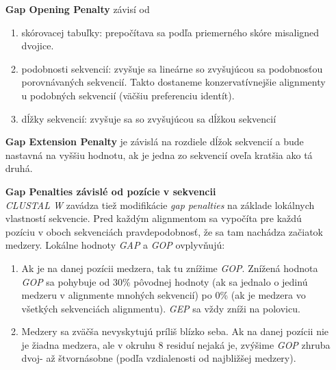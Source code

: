 \documentclass[nobib]{tufte-handout}
\begin{document}
 \begin{itemize}
 \item [\textbf{Gap Opening Penalty}] závisí od
	 \begin{enumerate}
	 \item skórovacej tabuľky: prepočítava sa podľa priemerného skóre misaligned dvojice.
	 \item podobnosti sekvencií: zvyšuje sa lineárne so zvyšujúcou sa podobnosťou porovnávaných sekvencií. Takto dostaneme konzervatívnejšie alignmenty u podobných sekvencií (väčšiu preferenciu identít).
	 \item dĺžky sekvencií: zvyšuje sa so zvyšujúcou sa dĺžkou sekvencií
	 \end{enumerate}

 \item[\textbf{Gap Extension Penalty}]
	 je závislá na rozdiele dĺžok sekvencií a bude nastavná na vyššiu hodnotu, ak je jedna zo sekvencií oveľa kratšia ako tá druhá.
	 
 \item[\textbf{Gap Penalties závislé od pozície v sekvencii}] $ $\\
 
\emph{CLUSTAL W} zavádza tiež modifikácie \emph{gap penalties} na základe lokálnych vlastností sekvencie. Pred každým alignmentom sa vypočíta pre každú pozíciu v oboch sekvenciách pravdepodobnosť, že sa tam nachádza začiatok medzery. Lokálne hodnoty \emph{GAP} a \emph{GOP} ovplyvňujú:

\begin{enumerate}
\item Ak je na danej pozícii medzera, tak tu znížime \emph{GOP}. Znížená hodnota \emph{GOP} sa pohybuje od 30\% pôvodnej hodnoty (ak sa jednalo o jedinú medzeru v alignmente mnohých sekvencií) po 0\% (ak je medzera vo všetkých sekvenciách alignmentu). \emph{GEP} sa vždy zníži na polovicu.
\item Medzery sa zväčša nevyskytujú príliš blízko seba. Ak na danej pozícii nie je žiadna medzera, ale v okruhu 8 residuí nejaká je, zvýšime \emph{GOP} zhruba dvoj- až štvornásobne (podľa vzdialenosti od najbližšej medzery).
  

\end{enumerate}
\end{itemize}
\end{document}
